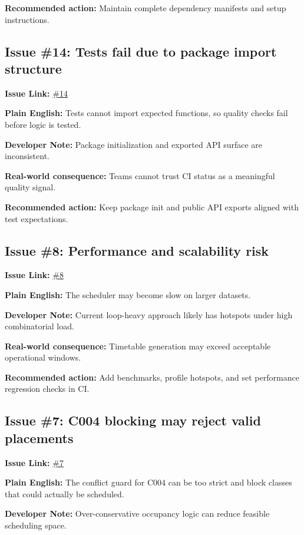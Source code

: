 \documentclass[12pt,a4paper]{article}
\begin{document}
\textbf{Recommended action:} Maintain complete dependency manifests and setup instructions.

\subsection*{Issue \#14: Tests fail due to package import structure}
\textbf{Issue Link:} \href{https://github.com/ArnavBallinCode/TimetableIIITDWD/issues/14}{\#14}

\textbf{Plain English:} Tests cannot import expected functions, so quality checks fail before logic is tested.

\textbf{Developer Note:} Package initialization and exported API surface are inconsistent.

\textbf{Real-world consequence:} Teams cannot trust CI status as a meaningful quality signal.

\textbf{Recommended action:} Keep package init and public API exports aligned with test expectations.

\subsection*{Issue \#8: Performance and scalability risk}
\textbf{Issue Link:} \href{https://github.com/ArnavBallinCode/TimetableIIITDWD/issues/8}{\#8}

\textbf{Plain English:} The scheduler may become slow on larger datasets.

\textbf{Developer Note:} Current loop-heavy approach likely has hotspots under high combinatorial load.

\textbf{Real-world consequence:} Timetable generation may exceed acceptable operational windows.

\textbf{Recommended action:} Add benchmarks, profile hotspots, and set performance regression checks in CI.

\subsection*{Issue \#7: C004 blocking may reject valid placements}
\textbf{Issue Link:} \href{https://github.com/ArnavBallinCode/TimetableIIITDWD/issues/7}{\#7}

\textbf{Plain English:} The conflict guard for C004 can be too strict and block classes that could actually be scheduled.

\textbf{Developer Note:} Over-conservative occupancy logic can reduce feasible scheduling space.
\end{document}

